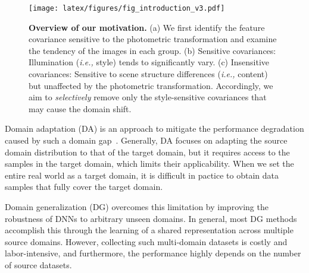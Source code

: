 \documentclass[final]{latex/cvpr}
\begin{document}
\begin{figure}[t!]
\begin{center}
  \texttt{[image: latex/figures/fig\_introduction\_v3.pdf]}
\end{center}
\vspace*{-0.1cm}
   \caption{\textbf{Overview of our motivation.} (a) We first identify the feature covariance sensitive to the photometric transformation and examine the tendency of the images in each group.
   (b) Sensitive covariances: Illumination (\textit{i.e.,} style) tends to significantly vary.
   (c) Insensitive covariances: Sensitive to scene structure differences (\textit{i.e.,} content) but unaffected by the photometric transformation.
Accordingly, we aim to \emph{selectively} remove only the style-sensitive covariances that may cause the domain shift.}
\label{fig:overview}
\vspace*{-0.45cm}
\end{figure}

Domain adaptation (DA) is an approach to mitigate the performance degradation caused by such a domain gap~\cite{ben2007analysis,ganin2016domain,hoffman2018cycada,ganin2015unsupervised,zou2018unsupervised,murez2018image,vu2019advent,pan2020unsupervised,saito2018maximum}.
Generally, DA focuses on adapting the source domain distribution to that of the target domain, but it requires access to the samples in the target domain, which limits their applicability. 
When we set the entire real world as a target domain, it is difficult in pactice to obtain data samples that fully cover the target domain.




Domain generalization (DG) overcomes this limitation by improving the robustness of DNNs to arbitrary unseen domains. 
In general, most DG methods~\cite{li2018domain,seo2019learning,dou2019domain,motiian2017unified,muandet2013domain,Ghifary_2015_ICCV,li2017learning,balaji2018metareg,li2019episodic,li2019feature} accomplish this through the learning of a shared representation across multiple source domains. However, collecting such multi-domain datasets is costly and labor-intensive, and furthermore, the performance highly depends on the number of source datasets.
\end{document}
